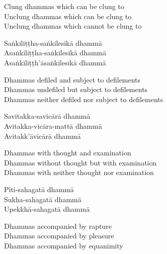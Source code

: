 \ifafive\clearpage\fi

\begin{english-verses}
  Clung dhammas which can be clung to\\
  Unclung dhammas which can be clung to\\
  Unclung dhammas which cannot be clung to
\end{english-verses}

\begin{pali-hang-continued}
  Saṅkiliṭṭha-saṅkilesikā dhammā\\
  Asaṅkiliṭṭha-saṅkilesikā dhammā\\
  Asaṅkiliṭṭh'āsaṅkilesikā dhammā
\end{pali-hang-continued}

\begin{english-verses}
  Dhammas defiled and subject to defilements\\
  Dhammas undefiled but subject to defilements\\
  Dhammas neither defiled nor subject to defilements
\end{english-verses}

\begin{pali-hang-continued}
  Savitakka-savicārā dhammā\\
  Avitakka-vicāra-mattā dhammā\\
  Avitakk'āvicārā dhammā
\end{pali-hang-continued}

\begin{english-verses}
  Dhammas with thought and examination\\
  Dhammas without thought but with examination\\
  Dhammas with neither thought nor examination
\end{english-verses}

\begin{pali-hang-continued}
  Pīti-sahagatā dhammā\\
  Sukha-sahagatā dhammā\\
  Upekkhā-sahagatā dhammā
\end{pali-hang-continued}

\begin{english-verses}
  Dhammas accompanied by rapture\\
  Dhammas accompanied by pleasure\\
  Dhammas accompanied by equanimity
\end{english-verses}

\ifbfive\clearpage\fi

